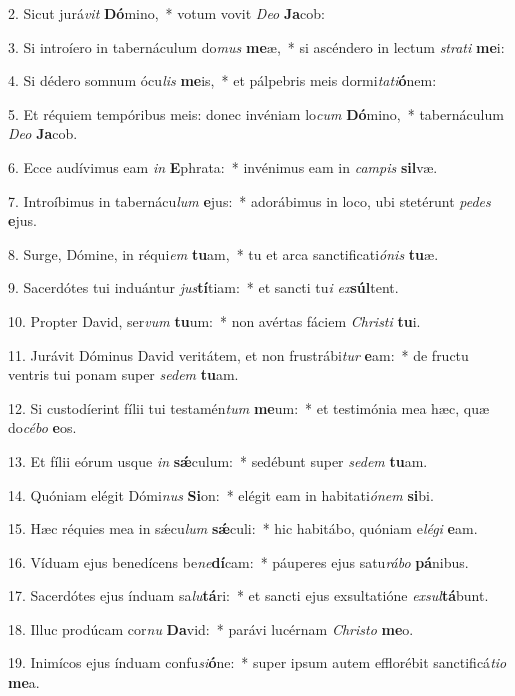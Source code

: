 2. Sicut jurá\textit{vit} \textbf{Dó}mino,~*  votum vovit \textit{De}\textit{o} \textbf{Ja}cob:\

3. Si introíero in tabernáculum do\textit{mus} \textbf{me}æ,~*  si ascéndero in lectum \textit{stra}\textit{ti} \textbf{me}i:\

4. Si dédero somnum ócu\textit{lis} \textbf{me}is,~*  et pálpebris meis dormi\textit{ta}\textit{ti}\textbf{ó}nem:\

5. Et réquiem tempóribus meis: donec invéniam lo\textit{cum} \textbf{Dó}mino,~*  tabernáculum \textit{De}\textit{o} \textbf{Ja}cob.\

6. Ecce audívimus eam \textit{in} \textbf{E}phrata:~*  invénimus eam in \textit{cam}\textit{pis} \textbf{sil}væ.\

7. Introíbimus in tabernácu\textit{lum} \textbf{e}jus:~*  adorábimus in loco, ubi stetérunt \textit{pe}\textit{des} \textbf{e}jus.\

8. Surge, Dómine, in réqui\textit{em} \textbf{tu}am,~*  tu et arca sanctificati\textit{ó}\textit{nis} \textbf{tu}æ.\

9. Sacerdótes tui induántur \textit{jus}\textbf{tí}tiam:~*  et sancti tu\textit{i} \textit{ex}\textbf{súl}tent.\

10. Propter David, ser\textit{vum} \textbf{tu}um:~*  non avértas fáciem \textit{Chris}\textit{ti} \textbf{tu}i.\

11. Jurávit Dóminus David veritátem, et non frustrábi\textit{tur} \textbf{e}am:~*  de fructu ventris tui ponam super \textit{se}\textit{dem} \textbf{tu}am.\

12. Si custodíerint fílii tui testamén\textit{tum} \textbf{me}um:~*  et testimónia mea hæc, quæ do\textit{cé}\textit{bo} \textbf{e}os.\

13. Et fílii eórum usque \textit{in} \textbf{sǽ}culum:~*  sedébunt super \textit{se}\textit{dem} \textbf{tu}am.\

14. Quóniam elégit Dómi\textit{nus} \textbf{Si}on:~*  elégit eam in habitati\textit{ó}\textit{nem} \textbf{si}bi.\

15. Hæc réquies mea in sǽcu\textit{lum} \textbf{sǽ}culi:~*  hic habitábo, quóniam e\textit{lé}\textit{gi} \textbf{e}am.\

16. Víduam ejus benedícens be\textit{ne}\textbf{dí}cam:~*  páuperes ejus satu\textit{rá}\textit{bo} \textbf{pá}nibus.\

17. Sacerdótes ejus índuam sa\textit{lu}\textbf{tá}ri:~*  et sancti ejus exsultatióne \textit{ex}\textit{sul}\textbf{tá}bunt.\

18. Illuc prodúcam cor\textit{nu} \textbf{Da}vid:~*  parávi lucérnam \textit{Chris}\textit{to} \textbf{me}o.\

19. Inimícos ejus índuam confu\textit{si}\textbf{ó}ne:~*  super ipsum autem efflorébit sanctificá\textit{ti}\textit{o} \textbf{me}a.\

